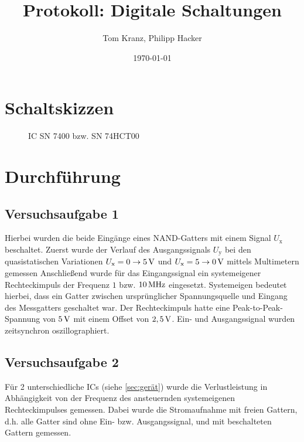 \documentclass[numbers=noenddot,12pt,a4paper]{scrartcl}
\title{Protokoll: Digitale Schaltungen}
\author{Tom Kranz, Philipp Hacker}
\date{\today}
\newcommand{\ix}[1]{_\text{#1}}
\begin{document}
\maketitle
\vspace*{\fill}
\tableofcontents
\vfill
\newpage
\section{Schaltskizzen}
\begin{figure}[H]
\centering
\caption{IC SN 7400 bzw. SN 74HCT00} \label{img:ic}
\end{figure}
\section{Durchführung}
\subsection{Versuchsaufgabe 1}
Hierbei wurden die beide Eingänge eines NAND-Gatters mit einem Signal $U\ix{x}$ beschaltet. Zuerst wurde der Verlauf des Ausgangssignals $U\ix{y}$ bei den quasistatischen Variationen $U\ix{x}=0\rightarrow\unit[5]{V}$ und $U\ix{x}=5\rightarrow\unit[0]{V}$ mittels Multimetern gemessen Anschließend wurde für das Eingangssignal ein systemeigener Rechteckimpuls der Frequenz $1$ bzw. $\unit[10]{MHz}$ eingesetzt. Systemeigen bedeutet hierbei, dass ein Gatter zwischen ursprünglicher Spannungsquelle und Eingang des Messgatters geschaltet war. Der Rechteckimpuls hatte eine Peak-to-Peak-Spannung von $\unit[5]{V}$ mit einem Offset von $\unit[2,5]{V}$. Ein- und Ausgangssignal wurden zeitsynchron oszillographiert.
\subsection{Versuchsaufgabe 2}
Für 2 unterschiedliche ICs (siehe \ref{sec:gerät}) wurde die Verlustleistung in Abhängigkeit von der Frequenz des ansteuernden systemeigenen Rechteckimpulses gemessen. Dabei wurde die Stromaufnahme mit freien Gattern, d.h. alle Gatter sind ohne Ein- bzw. Ausgangssignal, und mit beschalteten Gattern gemessen.
\end{document}
